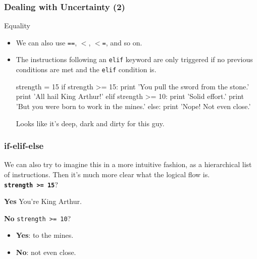 \documentclass[10pt]{beamer}
\begin{document}
\begin{frame}[fragile]
  \frametitle{Dealing with Uncertainty (2)}
  \begin{block}{Equality}
    \begin{itemize}
      \item We can also use \texttt{==}, \texttt{$<$}, \texttt{$<$=}, and so on.
      \item The instructions following an \texttt{elif} keyword are only triggered if no previous conditions are met and the \texttt{elif} condition is.
        \begin{pythoncode}
  strength = 15
  if strength >= 15:
    print 'You pull the sword from the stone.'
    print 'All hail King Arthur!'
  elif strength >= 10:
    print 'Solid effort.'
    print 'But you were born to work in the mines.'
  else:
    print 'Nope! Not even close.'
        \end{pythoncode}
      Looks like it's deep, dark and dirty for this guy.
    \end{itemize}
  \end{block}
\end{frame}

\begin{frame}[fragile]
  \frametitle{if-elif-else}
  We can also try to imagine this in a more intuitive fashion, as a hierarchical list of instructions.
  Then it's much more clear what the logical flow is. \\
  \vspace{10px}
  \large
  \textbf{\texttt{strength >= 15}}?
  \normalsize
  \begin{block}{\textbf{Yes}}
    You're King Arthur.
  \end{block}
  \vspace{10px}
  \begin{block}{\textbf{No}}
    \indent \texttt{strength >= 10}?
    \begin{itemize}
      \item \textbf{Yes}: to the mines.
      \item \textbf{No}: not even close.
    \end{itemize}
  \end{block}
\end{frame}
\end{document}
